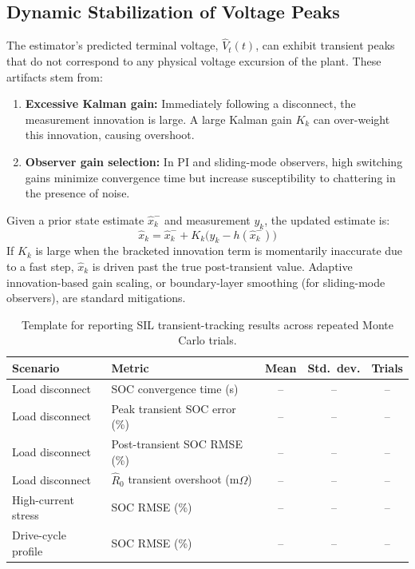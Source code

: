 \subsection{Dynamic Stabilization of Voltage Peaks}
\label{ssec:voltage_peak_stabilization}

The estimator's predicted terminal voltage, $\hat{V}_t(t)$, can exhibit transient peaks that do not correspond to any physical voltage excursion of the plant. These artifacts stem from:
\begin{enumerate}
	\item \textbf{Excessive Kalman gain:} Immediately following a disconnect, the measurement innovation is large. A large Kalman gain $K_k$ can over-weight this innovation, causing overshoot. 
	\item \textbf{Observer gain selection:} In PI and sliding-mode observers, high switching gains minimize convergence time but increase susceptibility to chattering in the presence of noise.
\end{enumerate}

Given a prior state estimate $\hat{x}_k^-$ and measurement $y_k$, the updated estimate is:
\begin{equation}
	\hat{x}_k = \hat{x}_k^- + K_k \big(y_k - h(\hat{x}_k^-)\big)
	\label{eq:kf_update}
\end{equation}
If $K_k$ is large when the bracketed innovation term is momentarily inaccurate due to a fast step, $\hat{x}_k$ is driven past the true post-transient value. Adaptive innovation-based gain scaling, or boundary-layer smoothing (for sliding-mode observers), are standard mitigations.



\begin{table}[htbp]
	\centering
	\caption{Template for reporting SIL transient-tracking results across repeated Monte Carlo trials.}
	\label{tab:sil_metric_summary_template}
	\renewcommand{\arraystretch}{1.3}
	\begin{tabularx}{\textwidth}{@{}X X c c c@{}}
		\toprule
		\textbf{Scenario} & \textbf{Metric} & \textbf{Mean} & \textbf{Std.\ dev.} & \textbf{Trials} \\
		\midrule
		Load disconnect & SOC convergence time (s) & -- & -- & -- \\
		Load disconnect & Peak transient SOC error (\%) & -- & -- & -- \\
		Load disconnect & Post-transient SOC RMSE (\%) & -- & -- & -- \\
		Load disconnect & $\hat{R}_0$ transient overshoot (m$\Omega$) & -- & -- & -- \\
		High-current stress & SOC RMSE (\%) & -- & -- & -- \\
		Drive-cycle profile & SOC RMSE (\%) & -- & -- & -- \\
		\bottomrule
	\end{tabularx}
\end{table}

